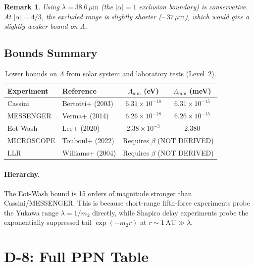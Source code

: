 \documentclass[11pt,a4paper]{article}
\newtheorem{remark}[theorem]{Remark}
\begin{document}
\begin{remark}
Using $\lambda = 38.6\,\mu\mathrm{m}$ (the $|\alpha| = 1$ exclusion
boundary) is conservative.  At $|\alpha| = 4/3$, the excluded range is
slightly shorter ($\sim 37\,\mu\mathrm{m}$), which would give a slightly
weaker bound on $\Lambda$.
\end{remark}

\subsection{Bounds Summary}

\begin{table}[h]
\centering
\caption{Lower bounds on $\Lambda$ from solar system and laboratory tests (Level~2).}
\label{tab:bounds}
\begin{tabular}{l l c c}
\toprule
Experiment & Reference & $\Lambda_{\min}$ (eV) & $\Lambda_{\min}$ (meV) \\
\midrule
Cassini    & Bertotti+ (2003) & $6.31 \times 10^{-18}$ & $6.31 \times 10^{-15}$ \\
MESSENGER  & Verma+ (2014)    & $6.26 \times 10^{-18}$ & $6.26 \times 10^{-15}$ \\
Eot-Wash   & Lee+ (2020)      & $2.38 \times 10^{-3}$  & $\mathbf{2.380}$ \\
MICROSCOPE & Touboul+ (2022)  & \multicolumn{2}{c}{Requires $\beta$ (NOT DERIVED)} \\
LLR        & Williams+ (2004) & \multicolumn{2}{c}{Requires $\beta$ (NOT DERIVED)} \\
\bottomrule
\end{tabular}
\end{table}

\paragraph{Hierarchy.}
The Eot-Wash bound is 15 orders of magnitude stronger than Cassini/MESSENGER.
This is because short-range fifth-force experiments probe the Yukawa range
$\lambda = 1/m_2$ directly, while Shapiro delay experiments probe the
exponentially suppressed tail $\exp(-m_2 r)$ at $r \sim 1\,\mathrm{AU}
\gg \lambda$.


\section{D-8: Full PPN Table}
\label{sec:ppn_table}
\end{document}
